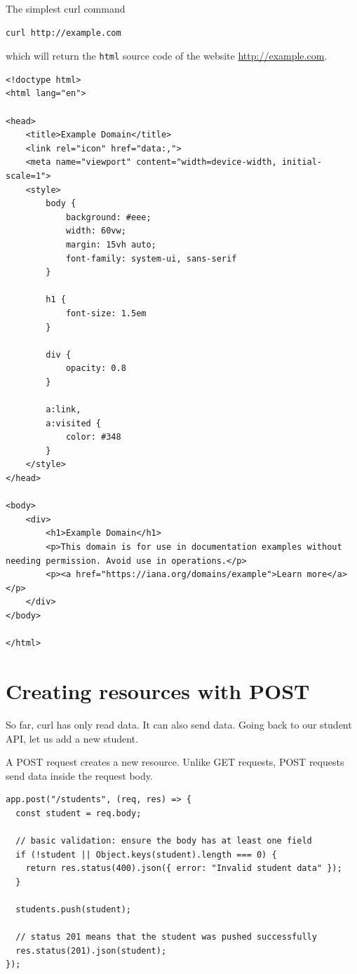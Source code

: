 The simplest curl command
\begin{verbatim}
curl http://example.com
\end{verbatim}
which will return the \texttt{html} source code of the website \url{http://example.com}.
\begin{verbatim}
<!doctype html>
<html lang="en">

<head>
    <title>Example Domain</title>
    <link rel="icon" href="data:,">
    <meta name="viewport" content="width=device-width, initial-scale=1">
    <style>
        body {
            background: #eee;
            width: 60vw;
            margin: 15vh auto;
            font-family: system-ui, sans-serif
        }

        h1 {
            font-size: 1.5em
        }

        div {
            opacity: 0.8
        }

        a:link,
        a:visited {
            color: #348
        }
    </style>
</head>

<body>
    <div>
        <h1>Example Domain</h1>
        <p>This domain is for use in documentation examples without needing permission. Avoid use in operations.</p>
        <p><a href="https://iana.org/domains/example">Learn more</a></p>
    </div>
</body>

</html>
\end{verbatim}
\section{Creating resources with POST}

So far, curl has only read data. It can also send data. Going back to our student API, let us add a new student.

A POST request creates a new resource. Unlike GET requests, POST
requests send data inside the request body.

\begin{verbatim}
app.post("/students", (req, res) => {
  const student = req.body;

  // basic validation: ensure the body has at least one field
  if (!student || Object.keys(student).length === 0) {
    return res.status(400).json({ error: "Invalid student data" });
  }

  students.push(student);

  // status 201 means that the student was pushed successfully
  res.status(201).json(student);
});
\end{verbatim}

